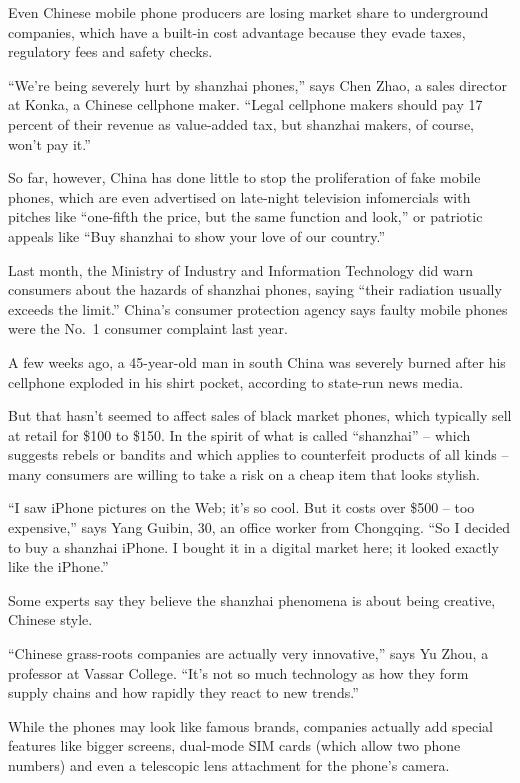 \documentclass[12pt,a4paper,onecolumn]{article}
\begin{document}
Even Chinese mobile phone producers are losing market share to underground companies, which have a
built-in cost advantage because they evade taxes, regulatory fees and safety checks.

``We're being severely hurt by shanzhai phones,'' says Chen Zhao, a sales director at Konka, a
Chinese cellphone maker. ``Legal cellphone makers should pay 17 percent of their revenue as
value-added tax, but shanzhai makers, of course, won't pay it.''

So far, however, China has done little to stop the proliferation of fake mobile phones, which are
even advertised on late-night television infomercials with pitches like ``one-fifth the price, but
the same function and look,'' or patriotic appeals like ``Buy shanzhai to show your love of our
country.''

Last month, the Ministry of Industry and Information Technology did warn consumers about the hazards
of shanzhai phones, saying ``their radiation usually exceeds the limit.'' China's consumer
protection agency says faulty mobile phones were the No.~1 consumer complaint last year.

A few weeks ago, a 45-year-old man in south China was severely burned after his cellphone exploded
in his shirt pocket, according to state-run news media.

But that hasn't seemed to affect sales of black market phones, which typically sell at retail for
\$100 to \$150. In the spirit of what is called ``shanzhai'' -- which suggests rebels or bandits and
which applies to counterfeit products of all kinds -- many consumers are willing to take a risk on a
cheap item that looks stylish.

``I saw iPhone pictures on the Web; it's so cool. But it costs over \$500 -- too expensive,'' says
Yang Guibin, 30, an office worker from Chongqing. ``So I decided to buy a shanzhai iPhone. I bought
it in a digital market here; it looked exactly like the iPhone.''

Some experts say they believe the shanzhai phenomena is about being creative, Chinese style.

``Chinese grass-roots companies are actually very innovative,'' says Yu Zhou, a professor at Vassar
College. ``It's not so much technology as how they form supply chains and how rapidly they react to
new trends.''

While the phones may look like famous brands, companies actually add special features like bigger
screens, dual-mode SIM cards (which allow two phone numbers) and even a telescopic lens attachment
for the phone's camera.
\end{document}
